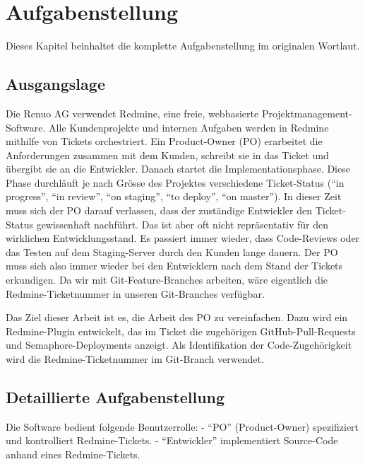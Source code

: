 \chapter{Aufgabenstellung}

Dieses Kapitel beinhaltet die komplette Aufgabenstellung im originalen Wortlaut.

\section{Ausgangslage}

Die Renuo AG verwendet Redmine, eine freie, webbasierte Projektmanagement-Software. Alle Kundenprojekte und internen Aufgaben werden in Redmine mithilfe von Tickets orchestriert. Ein Product-Owner (PO) erarbeitet die Anforderungen zusammen mit dem Kunden, schreibt sie in das Ticket und übergibt sie an die Entwickler. Danach startet die Implementationsphase. Diese Phase durchläuft je nach Grösse des Projektes verschiedene Ticket-Status (\enquote{in progress}, \enquote{in review}, \enquote{on staging}, \enquote{to deploy}, \enquote{on master}). In dieser Zeit muss sich der PO darauf verlassen, dass der zuständige Entwickler den Ticket-Status gewissenhaft nachführt. Das ist aber oft nicht repräsentativ für den wirklichen Entwicklungsstand. Es passiert immer wieder, dass Code-Reviews oder das Testen auf dem Staging-Server durch den Kunden lange dauern. Der PO muss sich also immer wieder bei den Entwicklern nach dem Stand der Tickets erkundigen. Da wir mit Git-Feature-Branches arbeiten, wäre eigentlich die Redmine-Ticketnummer in unseren Git-Branches verfügbar.

Das Ziel dieser Arbeit ist es, die Arbeit des PO zu vereinfachen. Dazu wird ein Redmine-Plugin entwickelt, das im Ticket die zugehörigen GitHub-Pull-Requests und Semaphore-Deployments anzeigt. Als Identifikation der Code-Zugehörigkeit wird die Redmine-Ticketnummer im Git-Branch verwendet.

\section{Detaillierte Aufgabenstellung}

Die Software bedient folgende Benutzerrolle: \newline
- \enquote{PO} (Product-Owner) spezifiziert und kontrolliert Redmine-Tickets. \newline
- \enquote{Entwickler} implementiert Source-Code anhand eines Redmine-Tickets. \newline

